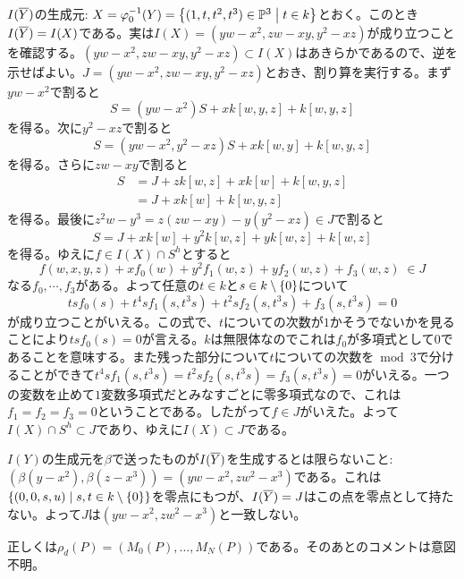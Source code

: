 \begin{description}
  $I(\overline{Y})$の生成元: $X = {\varphi}_0^{-1}(Y) = \left\{ (1,t,t^2,t^3) \in {\mathbb P}^3 \mathrel{} \middle| \mathrel{} t \in k \right\}$とおく。このとき$I(\overline{Y}) = I(X)$である。実は$I(X)=(yw-x^2, zw-xy, y^2-xz)$が成り立つことを確認する。$(yw-x^2, zw-xy, y^2-xz) \subset I(X)$はあきらかであるので、逆を示せばよい。$J = (yw-x^2, zw-xy, y^2-xz)$とおき、割り算を実行する。まず$yw-x^2$で割ると
  \[
  S = (yw-x^2)S + xk[w,y,z] + k[w,y,z]
  \]
  を得る。次に$y^2-xz$で割ると
  \[
S = (yw-x^2, y^2-xz)S + xk[w,y] + k[w,y,z]
  \]
  を得る。さらに$zw-xy$で割ると
  \begin{align*}
  S &= J + zk[w,z] + xk[w] + k[w,y,z] \\
  &= J + xk[w] + k[w,y,z]
\end{align*}
  を得る。最後に$z^2w-y^3 = z(zw-xy) -y(y^2-xz) \in J$で割ると
  \[
  S = J + xk[w] + y^2k[w,z] + yk[w,z] + k[w,z]
  \]
  を得る。ゆえに$f \in I(X) \cap S^h$とすると
  \[
  f(w,x,y,z) + xf_0(w) + y^2f_1(w,z) + yf_2(w,z) + f_3(w,z) \; \in J
  \]
  なる$f_0, \cdots , f_3$がある。よって任意の$t \in k$と$s \in k \setminus \{ 0 \}$について
  \[
  tsf_0(s) + t^4sf_1(s,t^3s) + t^2sf_2(s,t^3s) + f_3(s,t^3s) = 0
  \]
  が成り立つことがいえる。この式で、$t$についての次数が$1$かそうでないかを見ることにより$tsf_0(s)=0$が言える。$k$は無限体なのでこれは$f_0$が多項式として$0$であることを意味する。また残った部分について$t$についての次数を$\bmod 3$で分けることができて$t^4sf_1(s,t^3s)=t^2sf_2(s,t^3s)=f_3(s,t^3s) = 0$がいえる。一つの変数を止めて$1$変数多項式だとみなすごとに零多項式なので、これは$f_1 = f_2 = f_3 =0$ということである。したがって$f \in J$がいえた。よって$I(X) \cap S^h \subset J$であり、ゆえに$I(X) \subset J$である。

  $I(Y)$の生成元を$\beta$で送ったものが$I(\overline{Y})$を生成するとは限らないこと: $(\beta(y-x^2), \beta(z-x^3)) = (yw-x^2, zw^2-x^3)$である。これは$\left\{ (0,0,s,u) \mathrel{} \middle| \mathrel{} s,t \in k \setminus \{ 0 \} \right\}$を零点にもつが、$I(\overline{Y}) = J$はこの点を零点として持たない。よって$J$は$(yw-x^2, zw^2-x^3)$と一致しない。
\end{description}





\begin{rem}
正しくは$\rho_d(P) = ( M_0(P), \ldots , M_N(P))$である。そのあとのコメントは意図不明。
\end{rem}



